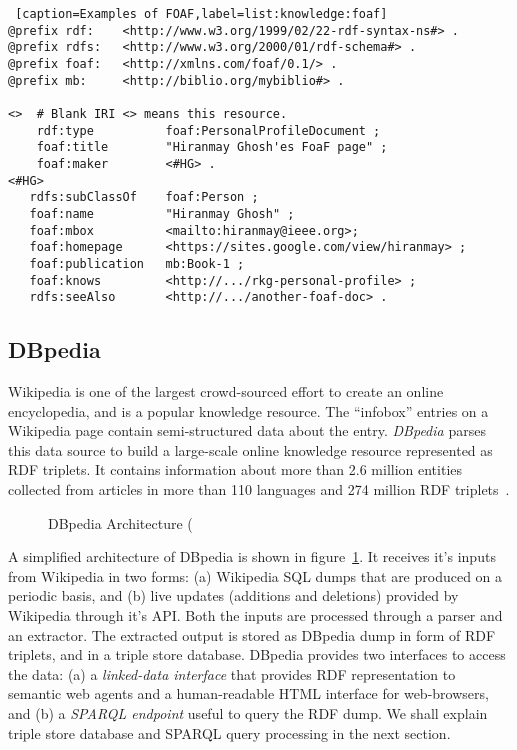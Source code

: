 \begin{lstlisting} [caption=Examples of FOAF,label=list:knowledge:foaf]
@prefix rdf:    <http://www.w3.org/1999/02/22-rdf-syntax-ns#> .
@prefix rdfs:   <http://www.w3.org/2000/01/rdf-schema#> .
@prefix foaf:   <http://xmlns.com/foaf/0.1/> .
@prefix mb:     <http://biblio.org/mybiblio#> .

<>  # Blank IRI <> means this resource.
    rdf:type          foaf:PersonalProfileDocument ;
    foaf:title        "Hiranmay Ghosh'es FoaF page" ;
    foaf:maker        <#HG> .
<#HG> 
   rdfs:subClassOf    foaf:Person ; 
   foaf:name          "Hiranmay Ghosh" ;
   foaf:mbox          <mailto:hiranmay@ieee.org>;
   foaf:homepage      <https://sites.google.com/view/hiranmay> ;
   foaf:publication   mb:Book-1 ;
   foaf:knows         <http://.../rkg-personal-profile> ;
   rdfs:seeAlso       <http://.../another-foaf-doc> .
\end{lstlisting}

\subsection{DBpedia}

 
Wikipedia is one of the largest crowd-sourced effort to create an online encyclopedia, and is a popular knowledge resource. The 
``infobox'' entries on a Wikipedia page contain semi-structured data about the entry. {\em DBpedia} parses this data source to
build a large-scale online knowledge resource represented as RDF triplets. It contains information about more than 2.6 million
entities collected from articles in more than 110 languages and 274 million RDF triplets~\citep{Lehman:2015}.

\begin{figure}[!htbp]
	\centerline{
	}
	\caption{DBpedia Architecture (}
	\label{fig:knowledge:dbpedia}
\end{figure}

 
 
A simplified architecture of DBpedia is shown in figure~\ref{fig:knowledge:dbpedia}. It receives it's inputs from Wikipedia in two
forms: (a) Wikipedia SQL dumps that are produced on a periodic basis, and (b) live updates (additions and deletions) provided by 
Wikipedia through it's API. Both the inputs are processed through a parser and an extractor. The extracted output is stored as 
DBpedia dump in form of RDF triplets, and in a triple store database. DBpedia provides two interfaces to access the data: 
(a) a {\em linked-data interface} that provides RDF representation to semantic web agents and a human-readable HTML interface for 
web-browsers, and (b) a {\em SPARQL endpoint} useful to query the RDF dump. We shall explain triple store database and SPARQL 
query processing in the next section.

